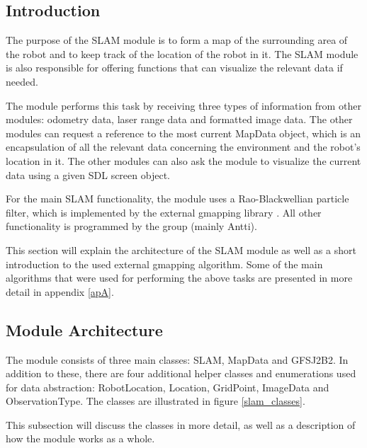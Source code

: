 \documentclass[a4paper,10pt]{article}
\begin{document}
\subsection{Introduction}

The purpose of the SLAM module is to form a map of the surrounding area of the robot and to keep track of the location of the robot in it. The SLAM module is also responsible for offering functions that can visualize the relevant data if needed.

The module performs this task by receiving three types of information from other modules: odometry data, laser range data and formatted image data. The other modules can request a reference to the most current MapData object, which is an encapsulation of all the relevant data concerning the environment and the robot's location in it. The other modules can also ask the module to visualize the current data using a given SDL screen object.

For the main SLAM functionality, the module uses a Rao-Blackwellian particle filter, which is implemented by the external gmapping library \cite{gmapping_home}. All other functionality is programmed by the group (mainly Antti).

This section will explain the architecture of the SLAM module as well as a short introduction to the used external gmapping algorithm. Some of the main algorithms that were used for performing the above tasks are presented in more detail in appendix \ref{apA}.

\subsection{Module Architecture}

The module consists of three main classes: SLAM, MapData and GFSJ2B2. In addition to these, there are four additional helper classes and enumerations used for data abstraction: RobotLocation, Location, GridPoint, ImageData and ObservationType. The classes are illustrated in figure \ref{slam_classes}.

This subsection will discuss the classes in more detail, as well as a description of how the module works as a whole.
\end{document}
